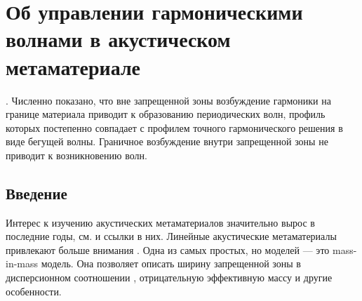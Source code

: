 \chapter{Об управлении гармоническими волнами в акустическом метаматериале}


. Численно показано, что вне запрещенной зоны возбуждение гармоники на границе материала приводит к образованию периодических волн, профиль которых постепенно совпадает с профилем точного гармонического решения в виде бегущей волны. Граничное возбуждение внутри запрещенной зоны не приводит к возникновению волн. 
  
\section{Введение}

Интерес к изучению акустических метаматериалов значительно вырос в последние годы, см. \cite{Cummer, Cvet, Huang2010, Ma, muller, delis1, Eremeyev2020, Porubov2019, Erofeev2020} и ссылки в них. Линейные акустические метаматериалы привлекают больше внимания \cite{Cvet, Huang2010, muller}. Одна из самых простых, но  моделей --- это mass-in-mass модель. Она позволяет описать ширину запрещенной зоны в дисперсионном соотношении \cite{Cvet, Huang2010}, отрицательную эффективную массу и другие особенности. 

